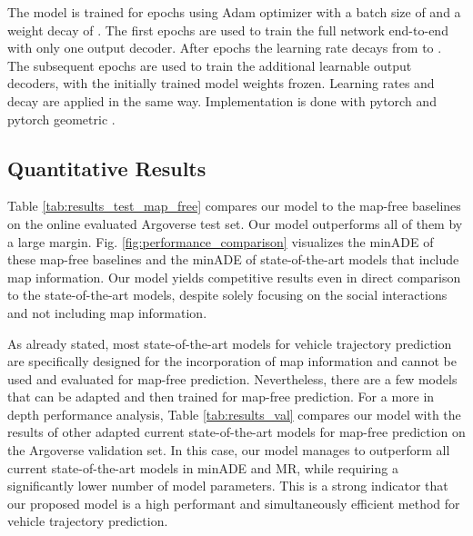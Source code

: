 \documentclass[letterpaper, 10 pt, conference]{ieeeconf}
\begin{document}
The model is trained for  epochs using Adam optimizer \cite{Kingma2015} with a batch size of  and a weight decay of .
The first  epochs are used to train the full network end-to-end with only one output decoder.
After  epochs the learning rate decays from  to .
The subsequent  epochs are used to train the additional learnable output decoders, with the initially trained model weights frozen.
Learning rates and decay are applied in the same way.
Implementation is done with pytorch \cite{Paszke2019} and pytorch geometric \cite{Fey2019}.

\subsection{Quantitative Results}
Table \ref{tab:results_test_map_free} compares our model to the map-free baselines \cite{Chang2019} on the online evaluated Argoverse test set.
Our model outperforms all of them by a large margin.
Fig. \ref{fig:performance_comparison} visualizes the minADE of these map-free baselines and the minADE of state-of-the-art models that include map information.
Our model yields competitive results even in direct comparison to the state-of-the-art models, despite solely focusing on the social interactions and not including map information.

As already stated, most state-of-the-art models for vehicle trajectory prediction are specifically designed for the incorporation of map information and cannot be used and evaluated for map-free prediction.
Nevertheless, there are a few models that can be adapted and then trained for map-free prediction.
For a more in depth performance analysis, Table \ref{tab:results_val} compares our model with the results of other adapted current state-of-the-art models for map-free prediction on the Argoverse validation set.
In this case, our model manages to outperform all current state-of-the-art models in minADE and MR, while requiring a significantly lower number of model parameters.
This is a strong indicator that our proposed model is a high performant and simultaneously efficient method for vehicle trajectory prediction.
\end{document}
